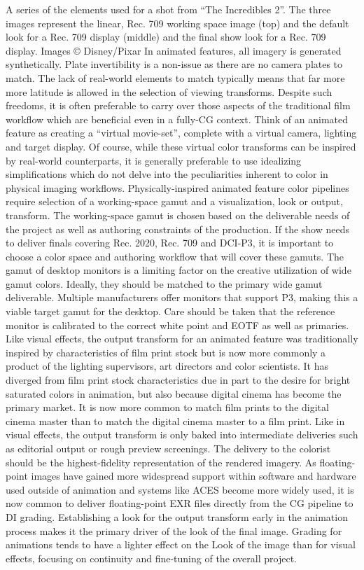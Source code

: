 A series of the elements used for a shot from “The Incredibles 2”. The three images represent the linear, Rec. 709 working space image (top) and the default look for a Rec. 709 display (middle) and the final show look for a Rec. 709 display.
 Images © Disney/Pixar
In animated features, all imagery is generated synthetically. Plate invertibility is a non-issue as there are no camera plates to match. The lack of real-world elements to match typically means that far more more latitude is allowed in the selection of viewing transforms. Despite such freedoms, it is often preferable to carry over those aspects of the traditional film workflow which are beneficial even in a fully-CG context. Think of an animated feature as creating a “virtual movie-set”, complete with a virtual camera, lighting and target display. Of course, while these virtual color transforms can be inspired by real-world counterparts, it is generally preferable to use idealizing simplifications which do not delve into the peculiarities inherent to color in physical imaging workflows.
Physically-inspired animated feature color pipelines require selection of a working-space gamut and a visualization, look or output, transform. The working-space gamut is chosen based on the deliverable needs of the project as well as authoring constraints of the production. If the show needs to deliver finals covering Rec. 2020, Rec. 709 and DCI-P3, it is important to choose a color space and authoring workflow that will cover these gamuts. The gamut of desktop monitors is a limiting factor on the creative utilization of wide gamut colors. Ideally, they should be matched to the primary wide gamut deliverable. Multiple manufacturers offer monitors that support P3, making this a viable target gamut for the desktop. Care should be taken that the reference monitor is calibrated to the correct white point and EOTF as well as primaries.
Like visual effects, the output transform for an animated feature was traditionally inspired by characteristics of film print stock but is now more commonly a product of the lighting supervisors, art directors and color scientists. It has diverged from film print stock characteristics due in part to the desire for bright saturated colors in animation, but also because digital cinema has become the primary market. It is now more common to match film prints to the digital cinema master than to match the digital cinema master to a film print. Like in visual effects, the output transform is only baked into intermediate deliveries such as editorial output or rough preview screenings. The delivery to the colorist should be the highest-fidelity representation of the rendered imagery. As floating-point images have gained more widespread support within software and hardware used outside of animation and systems like ACES become more widely used, it is now common to deliver floating-point EXR files directly from the CG pipeline to DI grading. Establishing a look for the output transform early in the animation process makes it the primary driver of the look of the final image. Grading for animations tends to have a lighter effect on the Look of the image than for visual effects, focusing on continuity and fine-tuning of the overall project.

